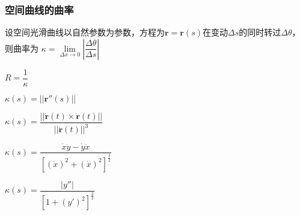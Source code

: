 \subsubsection{空间曲线的曲率}
\begin{definition}[曲率]
	设空间光滑曲线以自然参数为参数，方程为$ \bm{r}=\bm{r}(s) $在变动$ \Delta s $的同时转过$ \Delta \theta $，则曲率为
	$\kappa=\lim\limits_{\Delta x \to 0}\left |\dfrac{\Delta \theta}{\Delta s}\right |$
\end{definition}
\begin{definition}[曲率半径]
	$ R=\dfrac{1}{\kappa} $
\end{definition}

\begin{theorem}[自然参数下的计算公式]
	$\kappa(s)=||\bm{r}''(s)||$
\end{theorem}
\begin{theorem}[一般参数下的计算公式]
	$\kappa(s)=\dfrac{||\dot{\bm{r}}(t) \times \ddot{\bm{r}}(t)||}{||\dot{\bm{r}}(t)||^3}$
\end{theorem}
\begin{theorem}[平面曲线参数式下的计算公式]
	$\kappa(s)=\dfrac{\dot{x}\ddot{y}-\dot{y}\ddot{x}}{[(\dot{x})^2+(\dot{x})^2]^{\frac{3}{2}}}$
\end{theorem}
\begin{theorem}[平面曲线一般式下的计算公式]
	$\kappa(s)=\dfrac{|y''|}{[1+(y')^2]^\frac{3}{2}}$
\end{theorem}
